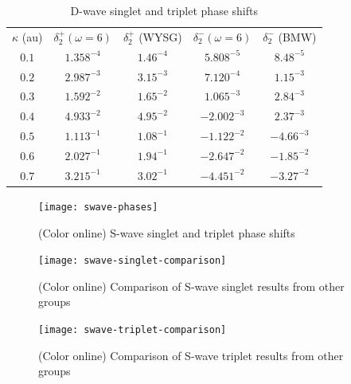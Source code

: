 \documentclass[preprint,showpacs,preprintnumbers,amsmath,amssymb]{revtex4}
\newcommand{\todoi}{\todo[inline]}
\begin{document}
\begin{table}[H]
\begin{center}
\begin{ruledtabular}
\begin{tabular}{c c c c c}
$\kappa$ (au) & $\delta_2^+ (\omega = 6)$ & $\delta_2^+$ (WYSG) & $\delta_2^- (\omega = 6)$ & $\delta_2^-$ (BMW) \\
\colrule
$0.1$ & $1.358^{-4}$ & $1.46^{-4}$ & $5.808^{-5}$ & $8.48^{-5}$ \\
$0.2$ & $2.987^{-3}$ & $3.15^{-3}$ & $7.120^{-4}$ & $1.15^{-3}$ \\
$0.3$ & $1.592^{-2}$ & $1.65^{-2}$ & $1.065^{-3}$ & $2.84^{-3}$ \\
$0.4$ & $4.933^{-2}$ & $4.95^{-2}$ & $-2.002^{-3}$ & $2.37^{-3}$ \\
$0.5$ & $1.113^{-1}$ & $1.08^{-1}$ & $-1.122^{-2}$ & $-4.66^{-3}$ \\
$0.6$ & $2.027^{-1}$ & $1.94^{-1}$ & $-2.647^{-2}$ & $-1.85^{-2}$ \\
$0.7$ & $3.215^{-1}$ & $3.02^{-1}$ & $-4.451^{-2}$ & $-3.27^{-2}$ \\
\end{tabular}
\end{ruledtabular}
\caption{D-wave singlet and triplet phase shifts}
\label{tab:DWavePhase}
\end{center}
\end{table}


\begin{figure}[ht]
	\centering
	\texttt{[image: swave-phases]}
	\caption{(Color online) S-wave singlet and triplet phase shifts}
	\label{fig:swave-phases}
\end{figure}

\begin{figure}[H]
	\centering
	\texttt{[image: swave-singlet-comparison]}
	\caption{(Color online) Comparison of S-wave singlet results from other groups}
	\label{fig:SwaveSingletComparison}
\end{figure}

\begin{figure}[H]
	\centering
	\texttt{[image: swave-triplet-comparison]}
	\caption{(Color online) Comparison of S-wave triplet results from other groups}
	\label{fig:SwaveTripletComparison}
\end{figure}

%
\end{document}
